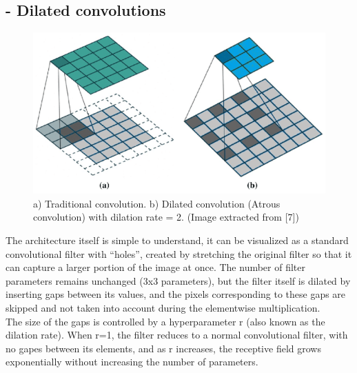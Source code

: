 \subsection{- Dilated convolutions }
\begin{figure}[H]
 \centering
 \includegraphics[scale=0.6]{IMAGENES/IMG7.PNG}
 \captionsetup{font=large}
 \caption {a) Traditional convolution. b) Dilated convolution (Atrous convolution) with dilation rate = 2. (Image extracted from [7]) }
\end{figure}

The architecture itself is simple to understand, it can be visualized as a standard convolutional filter with “holes”, created by stretching the original filter so that it can capture a larger portion of the image at once. The number of filter parameters remains unchanged (3x3 parameters), but the filter itself is dilated by inserting gaps between its values, and the pixels corresponding to these gaps are skipped and not taken into account during the elementwise multiplication.\\

The size of the gaps is controlled by a hyperparameter r (also known as the dilation rate). When r=1, the filter reduces to a normal convolutional filter, with no gapes between its elements, and as r increases, the receptive field grows exponentially without increasing the number of parameters. 

